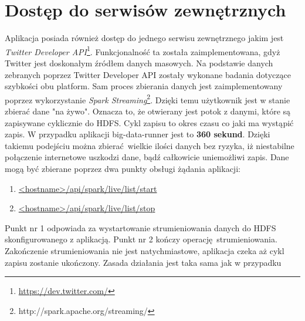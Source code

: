\section{Dostęp do serwisów zewnętrznych}
Aplikacja posiada również dostęp do jednego serwisu zewnętrznego jakim jest \textit{Twitter Developer API}\footnote{\url{https://dev.twitter.com/}}. Funkcjonalność ta została zaimplementowana, gdyż Twitter jest doskonałym źródłem danych masowych. Na podstawie danych zebranych poprzez Twitter Developer API zostały wykonane badania dotyczące szybkości obu platform. Sam proces zbierania danych jest zaimplementowany poprzez wykorzystanie \textit{Spark Streaming}\footnote{http://spark.apache.org/streaming/}. Dzięki temu użytkownik jest w stanie zbierać dane "na żywo". Oznacza to, że otwierany jest potok z danymi, które są zapisywane cyklicznie do HDFS. Cykl zapisu to okres czasu co jaki ma wystąpić zapis. W przypadku aplikacji big-data-runner jest to \textbf{360 sekund}. Dzięki takiemu podejściu można zbierać wielkie ilości danych bez ryzyka, iż niestabilne połączenie internetowe uszkodzi dane, bądź całkowicie uniemożliwi zapis. 
Dane mogą być zbierane poprzez dwa punkty obsługi żądania aplikacji:
\begin{enumerate}
	\item{\url{<hostname>/api/spark/live/list/start}}
	\item{\url{<hostname>/api/spark/live/list/stop}}
\end{enumerate}
Punkt nr 1 odpowiada za wystartowanie strumieniowania danych do HDFS skonfigurowanego z aplikacją. Punkt nr 2 kończy operację strumieniowania. Zakończenie strumieniowania nie jest natychmiastowe, aplikacja czeka aż cykl zapisu zostanie ukończony.  
Zasada działania jest taka sama jak w przypadku 

